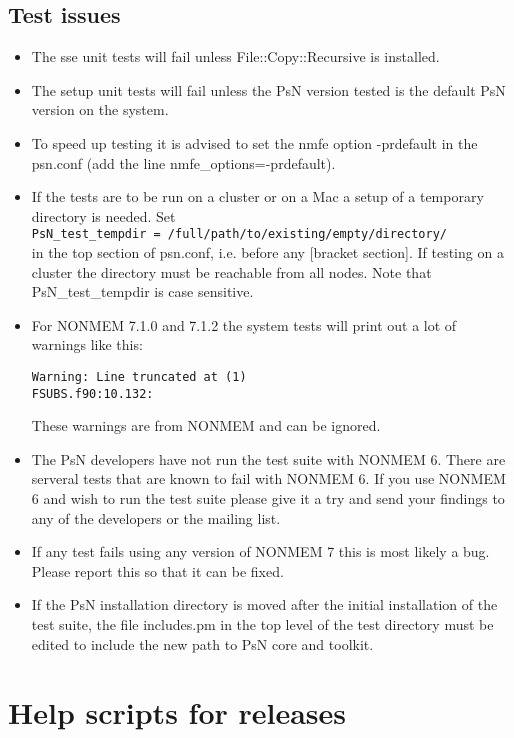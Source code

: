 \subsection{Test issues}
\begin{itemize}
    \item The sse unit tests will fail unless File::Copy::Recursive is installed.
    \item The setup unit tests will fail unless the PsN version tested is the default PsN version on the system.
	\item To speed up testing it is advised to set the nmfe option -prdefault in the psn.conf (add the line nmfe\_options=-prdefault).
	\item If the tests are to be run on a cluster or on a Mac a setup of a temporary directory is needed. Set\\
    \verb|PsN_test_tempdir = /full/path/to/existing/empty/directory/| \\
    in the top section of psn.conf, i.e. before any [bracket section].
     If testing on a cluster the directory must be reachable from all nodes.
     Note that PsN\_test\_tempdir is case sensitive.
	\item For NONMEM 7.1.0 and 7.1.2 the system tests will print out a lot of warnings like this:
\begin{verbatim}
Warning: Line truncated at (1)
FSUBS.f90:10.132:
\end{verbatim}
These warnings are from NONMEM and can be ignored.
	\item	The PsN developers have not run the test suite with NONMEM 6. There are serveral tests that are known to fail with NONMEM 6. If you use NONMEM 6 and wish to run the test suite please give it a try and send your findings to any of the developers or the mailing list.
	\item If any test fails using any version of NONMEM 7 this is most likely a bug. Please report this so that it can be fixed.
    \item If the PsN installation directory is moved after the initial installation of the test suite, the file includes.pm in the top level of the test directory
    must be edited to include the new path to PsN core and toolkit. 
\end{itemize} 

\section{Help scripts for releases}

